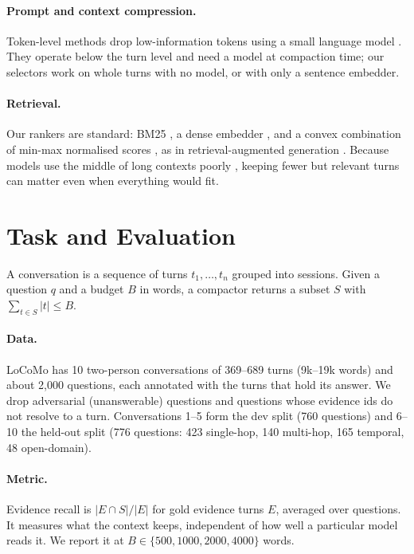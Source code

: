 \documentclass[11pt]{article}
\begin{document}
\paragraph{Prompt and context compression.}
Token-level methods drop low-information tokens using a small language model
\citep{li2023selective,jiang2023llmlingua}. They operate below the turn level and need a model
at compaction time; our selectors work on whole turns with no model, or with only a sentence
embedder.

\paragraph{Retrieval.}
Our rankers are standard: BM25 \citep{robertson2009bm25}, a dense embedder
\citep{nussbaum2024nomic}, and a convex combination of min-max normalised scores
\citep{bruch2023fusion}, as in retrieval-augmented generation \citep{lewis2020rag}. Because
models use the middle of long contexts poorly \citep{liu2024lost}, keeping fewer but relevant
turns can matter even when everything would fit.

\section{Task and Evaluation}

A conversation is a sequence of turns $t_1,\dots,t_n$ grouped into sessions. Given a question
$q$ and a budget $B$ in words, a compactor returns a subset $S$ with $\sum_{t\in S}|t|\le B$.

\paragraph{Data.}
LoCoMo \citep{maharana2024locomo} has 10 two-person conversations of 369--689 turns
(9k--19k words) and about 2,000 questions, each annotated with the turns that hold its answer.
We drop adversarial (unanswerable) questions and questions whose evidence ids do not resolve to
a turn. Conversations 1--5 form the dev split (760 questions) and 6--10 the held-out split
(776 questions: 423 single-hop, 140 multi-hop, 165 temporal, 48 open-domain).

\paragraph{Metric.}
Evidence recall is $|E\cap S|/|E|$ for gold evidence turns $E$, averaged over questions. It
measures what the context keeps, independent of how well a particular model reads it. We
report it at $B\in\{500,1000,2000,4000\}$ words.
\end{document}
